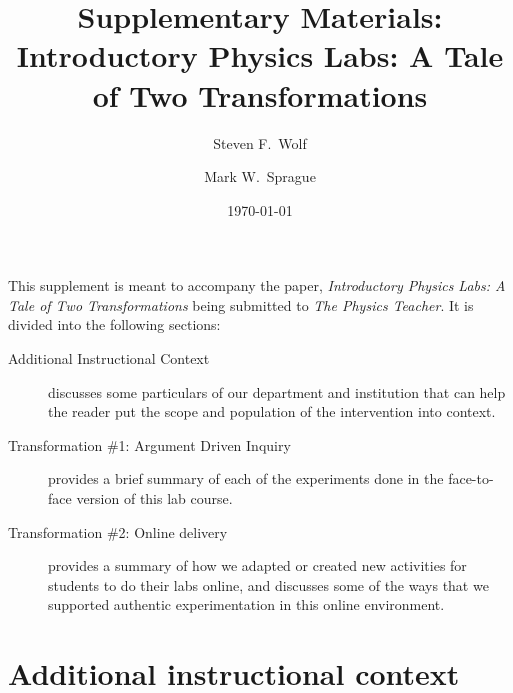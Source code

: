 \documentclass[aip, numerical, preprint]{revtex4-2}
\begin{document}
\title{Supplementary Materials: Introductory Physics Labs: A Tale of Two Transformations}

\author{Steven F.\ Wolf} 

\author{Mark W.\ Sprague} 



\date{\today}


\maketitle

This supplement is meant to accompany the paper, \textit{Introductory Physics Labs: A Tale of
  Two Transformations} being submitted to \textit{The Physics Teacher}.  It is divided into the
following sections:
\begin{description}
  \item[Additional Instructional Context] discusses some particulars of our department and
  institution that can help the reader put the scope and population of the intervention into
  context.
  \item[Transformation \#1: Argument Driven Inquiry] provides a brief summary of each of the
  experiments done in the face-to-face version of this lab course.
  \item[Transformation \#2: Online delivery] provides a summary of how we adapted or created
  new activities for students to do their labs online, and discusses some of the ways that we
  supported authentic experimentation in this online environment.
\end{description}

\section{Additional instructional context}
\end{document}
